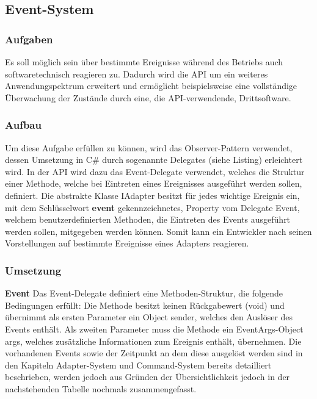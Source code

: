 
\subsection{Event-System}

\subsubsection{Aufgaben}
Es soll möglich sein über bestimmte Ereignisse während des Betriebs auch softwaretechnisch reagieren zu. Dadurch wird die API um ein weiteres Anwendungspektrum erweitert und ermöglicht beispielsweise eine vollständige Überwachung der Zustände durch eine, die API-verwendende, Drittsoftware.

\subsubsection{Aufbau}
Um diese Aufgabe erfüllen zu können, wird das Observer-Pattern verwendet, dessen Umsetzung in C\# durch sogenannte Delegates (siehe Listing) erleichtert wird. In der API wird dazu das Event-Delegate verwendet, welches die Struktur einer Methode, welche bei Eintreten eines Ereignisses ausgeführt werden sollen, definiert. 
\newline
Die abstrakte Klasse IAdapter besitzt für jedes wichtige Ereignis ein, mit dem Schlüsselwort \textbf{event} gekennzeichnetes, Property vom Delegate Event, welchem benutzerdefinierten Methoden, die Eintreten des Events ausgeführt werden sollen, mitgegeben werden können. Somit kann ein Entwickler nach seinen Vorstellungen auf bestimmte Ereignisse eines Adapters reagieren.

\subsubsection{Umsetzung}
\textbf{Event}
\newline
Das Event-Delegate definiert eine Methoden-Struktur, die folgende Bedingungen erfüllt:
\newline
Die Methode besitzt keinen Rückgabewert (void) und übernimmt als ersten Parameter ein Object sender, welches den Auslöser des Events enthält. Als zweiten Parameter muss die Methode ein EventArgs-Object args, welches zusätzliche Informationen zum Ereignis enthält, übernehmen.
\newline
Die vorhandenen Events sowie der Zeitpunkt an dem diese ausgelöst werden sind in den Kapiteln Adapter-System und Command-System bereits detailliert beschrieben, werden jedoch aus Gründen der Übersichtlichkeit jedoch in der nachstehenden Tabelle nochmals zusammengefasst.

